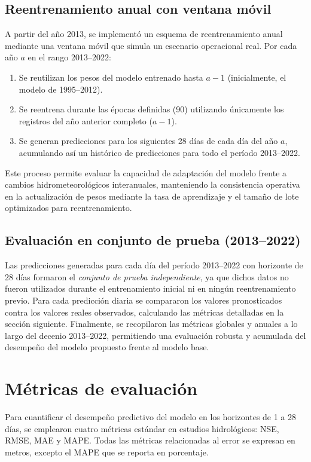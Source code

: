 \subsection{Reentrenamiento anual con ventana móvil}
A partir del año 2013, se implementó un esquema de reentrenamiento anual mediante una ventana móvil que simula un escenario operacional real. Por cada año $a$ en el rango 2013–2022:
\begin{enumerate}
  \item Se reutilizan los pesos del modelo entrenado hasta $a-1$ (inicialmente, el modelo de 1995–2012).
  \item Se reentrena durante las épocas definidas (90) utilizando únicamente los registros del año anterior completo ($a-1$).
  \item Se generan predicciones para los siguientes 28 días de cada día del año $a$, acumulando así un histórico de predicciones para todo el período 2013–2022.
\end{enumerate}
Este proceso permite evaluar la capacidad de adaptación del modelo frente a cambios hidrometeorológicos interanuales, manteniendo la consistencia operativa en la actualización de pesos mediante la tasa de aprendizaje y el tamaño de lote optimizados para reentrenamiento.

\subsection{Evaluación en conjunto de prueba (2013–2022)}
Las predicciones generadas para cada día del período 2013–2022 con horizonte de 28 días formaron el \emph{conjunto de prueba independiente}, ya que dichos datos no fueron utilizados durante el entrenamiento inicial ni en ningún reentrenamiento previo. Para cada predicción diaria se compararon los valores pronosticados contra los valores reales observados, calculando las métricas detalladas en la sección siguiente. Finalmente, se recopilaron las métricas globales y anuales a lo largo del decenio 2013–2022, permitiendo una evaluación robusta y acumulada del desempeño del modelo propuesto frente al modelo base.

\section{Métricas de evaluación} \label{sec:metricas_evaluacion}

Para cuantificar el desempeño predictivo del modelo en los horizontes de 1 a 28 días, se emplearon cuatro métricas estándar en estudios hidrológicos: NSE, RMSE, MAE y MAPE. Todas las métricas relacionadas al error se expresan en metros, excepto el MAPE que se reporta en porcentaje.

